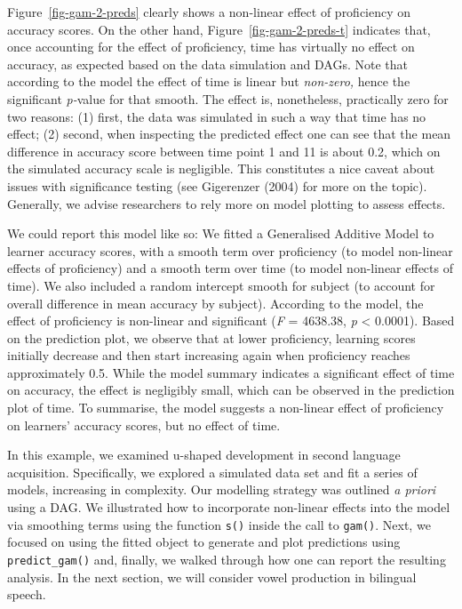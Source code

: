 \documentclass[
  letterpaper,
  DIV=11,
  numbers=noendperiod]{scrartcl}
\begin{document}
Figure~\ref{fig-gam-2-preds} clearly shows a non-linear effect of
proficiency on accuracy scores. On the other hand,
Figure~\ref{fig-gam-2-preds-t} indicates that, once accounting for the
effect of proficiency, time has virtually no effect on accuracy, as
expected based on the data simulation and DAGs. Note that according to
the model the effect of time is linear but \emph{non-zero,} hence the
significant \emph{p-}value for that smooth. The effect is, nonetheless,
practically zero for two reasons: (1) first, the data was simulated in
such a way that time has no effect; (2) second, when inspecting the
predicted effect one can see that the mean difference in accuracy score
between time point 1 and 11 is about 0.2, which on the simulated
accuracy scale is negligible. This constitutes a nice caveat about
issues with significance testing (see Gigerenzer (2004) for more on the
topic). Generally, we advise researchers to rely more on model plotting
to assess effects.

We could report this model like so: We fitted a Generalised Additive
Model to learner accuracy scores, with a smooth term over proficiency
(to model non-linear effects of proficiency) and a smooth term over time
(to model non-linear effects of time). We also included a random
intercept smooth for subject (to account for overall difference in mean
accuracy by subject). According to the model, the effect of proficiency
is non-linear and significant (\emph{F} = 4638.38, \emph{p} \textless{}
0.0001). Based on the prediction plot, we observe that at lower
proficiency, learning scores initially decrease and then start
increasing again when proficiency reaches approximately 0.5. While the
model summary indicates a significant effect of time on accuracy, the
effect is negligibly small, which can be observed in the prediction plot
of time. To summarise, the model suggests a non-linear effect of
proficiency on learners' accuracy scores, but no effect of time.

In this example, we examined u-shaped development in second language
acquisition. Specifically, we explored a simulated data set and fit a
series of models, increasing in complexity. Our modelling strategy was
outlined \emph{a priori} using a DAG. We illustrated how to incorporate
non-linear effects into the model via smoothing terms using the function
\texttt{s()} inside the call to \texttt{gam()}. Next, we focused on
using the fitted object to generate and plot predictions using
\texttt{predict\_gam()} and, finally, we walked through how one can
report the resulting analysis. In the next section, we will consider
vowel production in bilingual speech.
\end{document}
